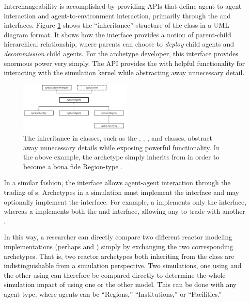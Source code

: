 Interchangeability is accomplished by providing \glspl{API} that define agent-to-agent
interaction and agent-to-environment interaction, primarily through the
 and  interfaces. Figure \ref{fig:agent_uml} shows 
the ``inheritance'' structure of the  class in a \gls{UML} diagram 
format. It shows how the  interface
provides a notion of parent-child hierarchical relationship, where parents can
choose to \textit{deploy} child agents and \textit{decommission} child
agents. For the archetype developer, this interface provides enormous power
very simply. The \gls{API} provides the  with helpful functionality for 
interacting with the \Cyclus simulation kernel while abstracting away unnecessary 
detail.

\begin{figure}[htbp!]
\begin{center}
\includegraphics[width=0.5\textwidth]{./images/agent_uml}
\end{center}
\caption{The inheritance in \Cyclus classes, such as the , 
, , and  classes, abstract away 
unnecessary details while exposing powerful functionality. In the above 
example, the  archetype simply inherits from  in 
order to become a bona fide Region-type .}
\label{fig:agent_uml}
\end{figure}

In a similar fashion, the  interface allows agent-agent interaction through the
trading of s. Archetypes in a \Cyclus simulation must
implement the  interface and may optionally implement the
 interface. For example, a  implements only the
 interface, whereas a  implements both the
 and  interface, allowing any  to
trade with another .

In this way, a researcher can directly compare two different reactor modeling 
implementations (perhaps  and ) 
simply by exchanging the two corresponding archetypes. That is, two reactor 
archetypes both inheriting from the  class are indistinguishable 
from a simulation perspective. Two simulations, one using 
 and the other using  can therefore 
be compared directly to determine the whole-simulation impact of using one or the other model.
This can be done with any agent type, where agents can be ``Regions,'' 
``Institutions,'' or ``Facilities.''

